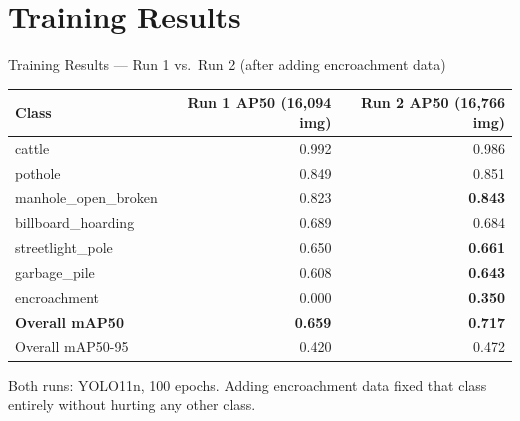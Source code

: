 \documentclass[10pt]{beamer}
\begin{document}
\section{Training Results}
\begin{frame}{Training Results — Run 1 vs.\ Run 2 (after adding encroachment data)}
  \begin{table}
    \centering\small
    \begin{tabular}{lrr}
      \toprule
      Class & Run 1 AP50 (16{,}094 img) & Run 2 AP50 (16{,}766 img) \\
      \midrule
      cattle               & 0.992 & 0.986 \\
      pothole              & 0.849 & 0.851 \\
      manhole\_open\_broken& 0.823 & \textbf{0.843} \\
      billboard\_hoarding  & 0.689 & 0.684 \\
      streetlight\_pole    & 0.650 & \textbf{0.661} \\
      garbage\_pile        & 0.608 & \textbf{0.643} \\
      encroachment         & 0.000 & \textbf{0.350} \\
      \midrule
      \textbf{Overall mAP50} & \textbf{0.659} & \textbf{0.717} \\
      Overall mAP50-95     & 0.420 & 0.472 \\
      \bottomrule
    \end{tabular}
  \end{table}
  Both runs: YOLO11n, 100 epochs. Adding encroachment data fixed that class
  entirely without hurting any other class.
\end{frame}
\end{document}
